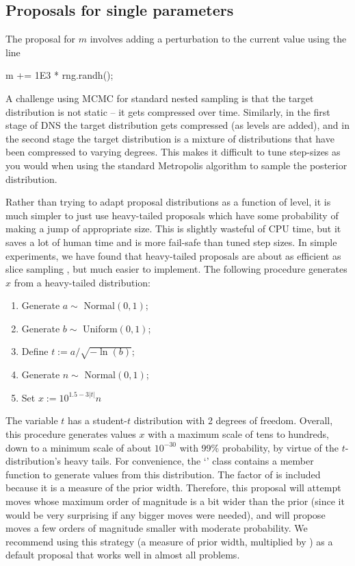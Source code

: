 \documentclass[article]{jss}
\begin{document}
\subsection{Proposals for single parameters}\label{sec:proposals}
The proposal for $m$ involves adding a perturbation to the current
value using the line
%
\begin{CodeChunk}
\begin{CodeInput}
m += 1E3 * rng.randh();
\end{CodeInput}
\end{CodeChunk}
%
A challenge using MCMC for standard nested sampling is that the target
distribution is not static -- it gets compressed over time. Similarly, in
the first stage of DNS the target distribution gets compressed (as levels are
added), and in the second stage the target distribution is a mixture of
distributions that have been compressed to varying degrees.
This makes it difficult to tune step-sizes as you would when using
the standard Metropolis algorithm to sample the posterior distribution.

Rather than trying to adapt proposal distributions as a function of level,
it is much simpler to just use heavy-tailed proposals which have some
probability of making a jump of appropriate size. This is slightly
wasteful of CPU time, but it saves a lot of human time and is more
fail-safe than tuned step sizes.
In simple experiments, we have found that heavy-tailed proposals are
about as efficient as slice sampling \citep{neal2003slice}, but much easier to
implement. The following procedure generates
$x$ from a heavy-tailed distribution:

\begin{enumerate}
\item Generate $a \sim$ Normal$(0, 1)$;
\item Generate $b \sim$ Uniform$(0, 1)$;
\item Define $t := a/\sqrt{-\ln(b)}$;
\item Generate $n \sim$ Normal$(0, 1)$;
\item Set $x := 10^{1.5 - 3|t|}n$
\end{enumerate}
The variable $t$ has a student-$t$ distribution with 2 degrees of freedom.
Overall, this procedure generates values $x$
with a maximum scale of tens to hundreds, down to
a minimum scale of about $10^{-30}$ with 99\% probability, by virtue
of the $t$-distribution's heavy tails.
For convenience, the `' class contains a member function 
to generate values from this distribution.
The factor of  is included because it is a measure of the prior
width. Therefore, this proposal will attempt moves whose maximum order of
magnitude is a bit wider than the prior (since it would be very surprising
if any bigger moves were needed), and will propose moves a few orders of
magnitude smaller with moderate probability. We recommend using
this strategy (a measure of prior width, multiplied by ) as
a default proposal that works well in almost all problems.
\end{document}
